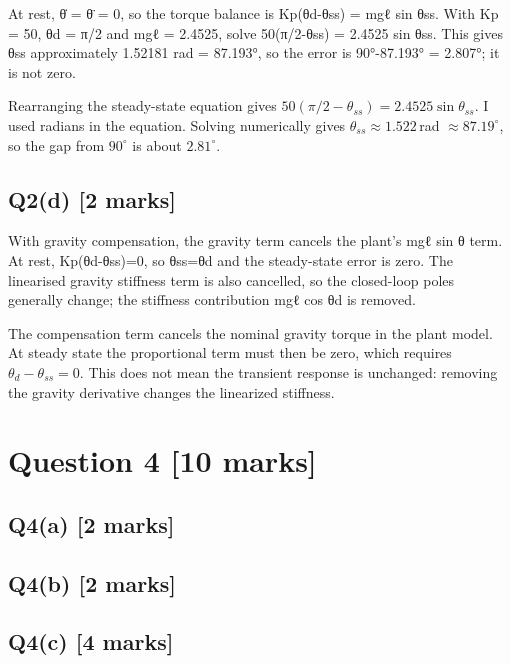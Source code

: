 \documentclass[11pt,a4paper]{article}
\begin{document}
At rest, θ̇ = θ̈ = 0, so the torque balance is Kp(θd-θss) = mgℓ sin θss.
With Kp = 50, θd = π/2 and mgℓ = 2.4525, solve 50(π/2-θss) = 2.4525 sin θss.
This gives θss approximately 1.52181 rad = 87.193°, so the error is 90°-87.193° = 2.807°; it is not zero.\par\smallskip Rearranging the steady-state equation gives $50(\pi/2-\theta_{ss})=2.4525\sin\theta_{ss}$. I used radians in the equation. Solving numerically gives $\theta_{ss}\approx1.522\,$rad $\approx87.19^\circ$, so the gap from $90^\circ$ is about $2.81^\circ$.

\subsection*{Q2(d) \hfill [2 marks]}

With gravity compensation, the gravity term cancels the plant's mgℓ sin θ term.
At rest, Kp(θd-θss)=0, so θss=θd and the steady-state error is zero.
The linearised gravity stiffness term is also cancelled, so the closed-loop poles generally change; the stiffness contribution mgℓ cos θd is removed.\par\smallskip The compensation term cancels the nominal gravity torque in the plant model. At steady state the proportional term must then be zero, which requires $\theta_d-\theta_{ss}=0$. This does not mean the transient response is unchanged: removing the gravity derivative changes the linearized stiffness.

\section*{Question 4 \hfill [10 marks]}
\subsection*{Q4(a) \hfill [2 marks]}

\vspace{2mm}

\subsection*{Q4(b) \hfill [2 marks]}

\vspace{2mm}

\subsection*{Q4(c) \hfill [4 marks]}
\end{document}
